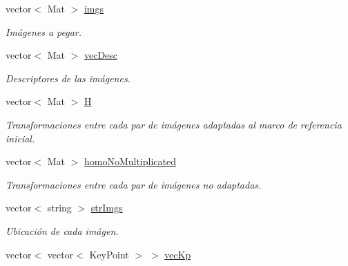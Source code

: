 \begin{DoxyCompactItemize}
vector$<$ Mat $>$ \mbox{\hyperlink{classuav_1_1Stitcher_af0c6f4217fb85386b4af03330997d960}{imgs}}
\begin{DoxyCompactList}\small\item\em Imágenes a pegar. \end{DoxyCompactList}\item 
\mbox{\label{classuav_1_1Stitcher_a742222e7b42e4ccfcda30eea161d1f02}} 
vector$<$ Mat $>$ \mbox{\hyperlink{classuav_1_1Stitcher_a742222e7b42e4ccfcda30eea161d1f02}{vec\+Desc}}
\begin{DoxyCompactList}\small\item\em Descriptores de las imágenes. \end{DoxyCompactList}\item 
\mbox{\label{classuav_1_1Stitcher_a1fad5b1dfd31fa5a9ec63b41b6e6eda1}} 
vector$<$ Mat $>$ \mbox{\hyperlink{classuav_1_1Stitcher_a1fad5b1dfd31fa5a9ec63b41b6e6eda1}{H}}
\begin{DoxyCompactList}\small\item\em Transformaciones entre cada par de imágenes adaptadas al marco de referencia inicial. \end{DoxyCompactList}\item 
\mbox{\label{classuav_1_1Stitcher_a1ff9477028582e3b935101bafb64cde7}} 
vector$<$ Mat $>$ \mbox{\hyperlink{classuav_1_1Stitcher_a1ff9477028582e3b935101bafb64cde7}{homo\+No\+Multiplicated}}
\begin{DoxyCompactList}\small\item\em Transformaciones entre cada par de imágenes no adaptadas. \end{DoxyCompactList}\item 
\mbox{\label{classuav_1_1Stitcher_a1217b2cb8a67e8928b0073b6478aa594}} 
vector$<$ string $>$ \mbox{\hyperlink{classuav_1_1Stitcher_a1217b2cb8a67e8928b0073b6478aa594}{str\+Imgs}}
\begin{DoxyCompactList}\small\item\em Ubicación de cada imágen. \end{DoxyCompactList}\item 
\mbox{\label{classuav_1_1Stitcher_af1e3706aa47771911eb5429ade12c287}} 
vector$<$ vector$<$ Key\+Point $>$ $>$ \mbox{\hyperlink{classuav_1_1Stitcher_af1e3706aa47771911eb5429ade12c287}{vec\+Kp}}

\end{DoxyCompactItemize}
